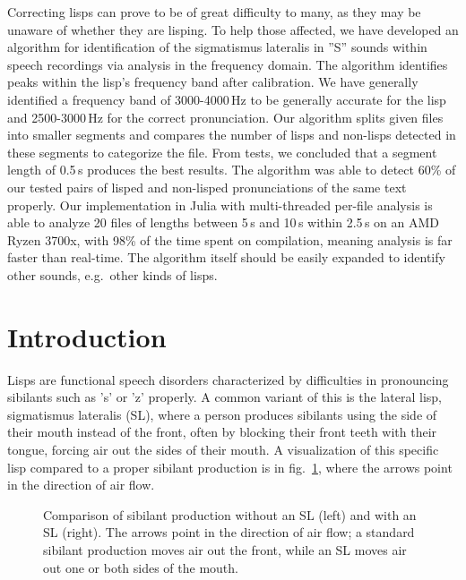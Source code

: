 \documentclass{IEEEtran}
\begin{document}
Correcting lisps can prove to be of great difficulty to many,
as they may be unaware of whether they are lisping.
To help those affected,
we have developed an algorithm for identification of the sigmatismus lateralis in ''S'' sounds within speech recordings via analysis in the frequency domain.
The algorithm identifies peaks within the lisp's frequency band after calibration.
We have generally identified a frequency band of 3000-4000\,Hz to be generally accurate for the lisp and 2500-3000\,Hz for the correct pronunciation.
Our algorithm splits given files into smaller segments and compares the number of lisps and non-lisps detected in these segments to categorize the file.
From tests,
we concluded that a segment length of 0.5\,s produces the best results.
The algorithm was able to detect 60\% of our tested pairs of lisped and non-lisped pronunciations of the same text properly.
Our implementation in Julia with multi-threaded per-file analysis is able to analyze 20 files of lengths between 5\,s and 10\,s within 2.5\,s on an AMD Ryzen 3700x,
with 98\% of the time spent on compilation,
meaning analysis is far faster than real-time.
The algorithm itself should be easily expanded to identify other sounds,
e.g.\ other kinds of lisps.

\section{Introduction}

Lisps are functional speech disorders characterized by difficulties in pronouncing sibilants such as 's' or 'z' properly.
A common variant of this is the lateral lisp,
sigmatismus lateralis (SL),
where a person produces sibilants using the side of their mouth instead of the front,
often by blocking their front teeth with their tongue,
forcing air out the sides of their mouth.
A visualization of this specific lisp compared to a proper sibilant production is in fig.\ \ref{lispvisual},
where the arrows point in the direction of air flow.

\begin{figure}[h]
\caption{Comparison of sibilant production without an SL (left) and with an SL (right). 
The arrows point in the direction of air flow;
a standard sibilant production moves air out the front,
while an SL moves air out one or both sides of the mouth.}\label{lispvisual}
\end{figure}
\end{document}
